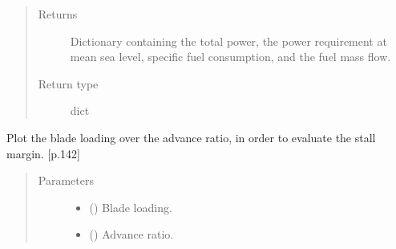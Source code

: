\documentclass[letterpaper,10pt,english]{sphinxmanual}
\begin{document}
\begin{fulllineitems}
\begin{fulllineitems}
\begin{quote}
\begin{description}
\begin{itemize}
\end{itemize}

\item[{Returns}] \leavevmode
\sphinxAtStartPar
Dictionary containing the total power, the power requirement at
mean sea level, specific fuel consumption, and the fuel mass flow.

\item[{Return type}] \leavevmode
\sphinxAtStartPar
dict

\end{description}\end{quote}

\end{fulllineitems}


\begin{fulllineitems}
\label{\detokenize{modules/helicopter:helicopter.Helicopter.plot_blade_loading}}
\sphinxAtStartPar
Plot the blade loading over the advance ratio, in order to evaluate
the stall margin. {[}p.142{]}
\begin{quote}\begin{description}
\item[{Parameters}] \leavevmode\begin{itemize}
\item {} 
\sphinxAtStartPar
{} () \textendash{} Blade loading.

\item {} 
\sphinxAtStartPar
{} () \textendash{} Advance ratio.

\end{itemize}

\end{description}\end{quote}

\end{fulllineitems}



\end{fulllineitems}
\end{document}
